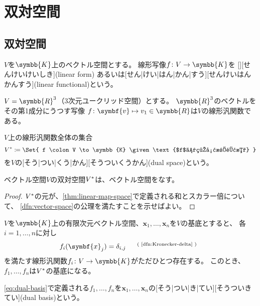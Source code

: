 \documentclass[../sotsu.tex]{subfiles}
\begin{document}
\section{双対空間}

\subsection{双対空間}

\begin{definition}[線形汎関数]
    $V$を$\symbb{K}$上のベクトル空間とする。
    線形写像$f \colon V \to \symbb{K}$を
    [][せんけいけいしき](linear form)
    あるいは[せん|けい|はん|かん|すう][せんけいはんかんすう](linear functional)という。
\end{definition}

\begin{example}
    $V = \symbb{R}^3$（3次元ユークリッド空間）とする。
    $\symbb{R}^3$のベクトルをその第1成分にうつす写像
    $f \colon \symbf{v} \mapsto v_1 \in \symbb{R}$は$V$の線形汎関数である。
\end{example}


\begin{definition}[双対空間]
    \label{dfn:dual-space}
    $V$上の線形汎関数全体の集合
    \begin{equation}
        \dual{V}  \coloneq  \Set{  f \colon V \to \symbb{K}  \given  \text{$f$は線形汎関数}  }
    \end{equation}
    を$V$の[そう|つい|くう|かん][そうついくうかん](dual space)という\cite[\S 4.1]{saito-lin-2007}。
\end{definition}


\begin{proposition}
    ベクトル空間$V$の双対空間${V}^*$は、ベクトル空間をなす\cite[\S 4.1]{saito-lin-2007}。
\end{proposition}

\begin{proof}
    ${V}^*$の元が、\cref{thm:linear-map-space}で定義される和とスカラー倍について、
    \cref{dfn:vector-space}の公理を満たすことを示せばよい。
\end{proof}


\begin{definition}[双対基底]
    \label{dfn:dual-basis}
    $V$を$\symbb{K}$上の有限次元ベクトル空間、$\symbf{x}_1, \dots, \symbf{x}_n$を$V$の基底とすると、
    各$i = 1, \dots, n$に対し
    \begin{equation}
        \label{eq:dual-basis}
        f_i (\symbf{x}_j) = \delta_{i, j} \quad \text{\refdfn{dfn:Kronecker-delta}}
    \end{equation}
    を満たす線形汎関数$f_i \colon V \to \symbb{K}$がただひとつ存在する。
    このとき、$f_1, \dots, f_n$は${V}^*$の基底になる。

    \cref{eq:dual-basis}で定義される$f_1, \dots, f_n$を$\symbf{x}_1, \dots, \symbf{x}_n$の[そう|つい|き|てい][そうついきてい](dual basis)という。
\end{definition}
\end{document}

